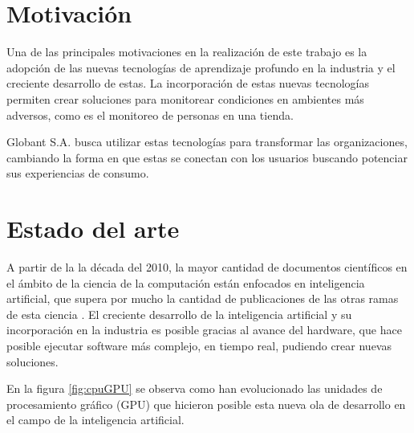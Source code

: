 

\section{Motivación}
\label{sec:motivacion}

Una de las principales motivaciones en la realización de este trabajo es la adopción de las nuevas tecnologías de aprendizaje profundo en la industria y el  creciente desarrollo de estas. La incorporación de estas nuevas tecnologías permiten crear soluciones para monitorear condiciones en ambientes más adversos, como es el monitoreo de personas en una tienda.

Globant S.A. busca utilizar estas tecnologías para transformar las organizaciones, cambiando la forma en que estas se conectan con los usuarios buscando potenciar sus experiencias de consumo.

\newpage


\section{Estado del arte}
\label{sec:estadoDelArte}

A partir de la la década del 2010, la mayor cantidad de documentos científicos en el ámbito de la ciencia de la computación están enfocados en inteligencia artificial, que supera por mucho la cantidad de publicaciones de las otras ramas de esta ciencia \citep{AI_PAPERS}. El creciente desarrollo de la inteligencia artificial y su incorporación en la industria es posible gracias al avance del hardware, que hace posible ejecutar software más complejo, en tiempo real, pudiendo crear nuevas soluciones.

En la figura \ref{fig:cpuGPU} se observa como han evolucionado las unidades de procesamiento gráfico (GPU) que hicieron posible esta nueva ola de desarrollo en el campo de la inteligencia artificial.

